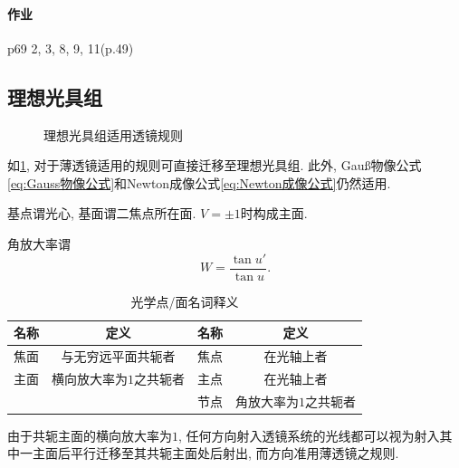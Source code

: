 \documentclass{ctexart}
\begin{document}
\paragraph{作业} %
\label{par:作业}

p69 2, 3, 8, 9, 11(p.49)




\subsection{理想光具组} %
\label{sub:理想光具组}

\begin{figure}
    \centering
    \caption{理想光具组适用透镜规则}
    \label{fig:理想光具组适用透镜规则}
\end{figure}
如\cref{fig:理想光具组适用透镜规则}, 对于薄透镜适用的规则可直接迁移至理想光具组. 此外, Gau\ss 物像公式\eqref{eq:Gauss物像公式}和Newton成像公式\eqref{eq:Newton成像公式}仍然适用.
\par
基点谓光心, 基面谓二焦点所在面. $V=\pm 1$时构成主面.
\par
角放大率谓
\[ W = \frac{\tan u'}{\tan u}. \]
\begin{table}[hb]
    \begin{tabular}{|c|c|c|c|}
        \hline
        名称 & 定义 & 名称 & 定义\\
        \hline
        焦面 & 与无穷远平面共轭者 & 焦点 & 在光轴上者 \\
        \hline
        主面 & 横向放大率为$1$之共轭者 & 主点 & 在光轴上者 \\
        \hline
        & & 节点 & 角放大率为$1$之共轭者 \\
        \hline
    \end{tabular}
    \caption{光学点/面名词释义}
\end{table}
由于共轭主面的横向放大率为$1$, 任何方向射入透镜系统的光线都可以视为射入其中一主面后平行迁移至其共轭主面处后射出, 而方向准用薄透镜之规则.
\end{document}

